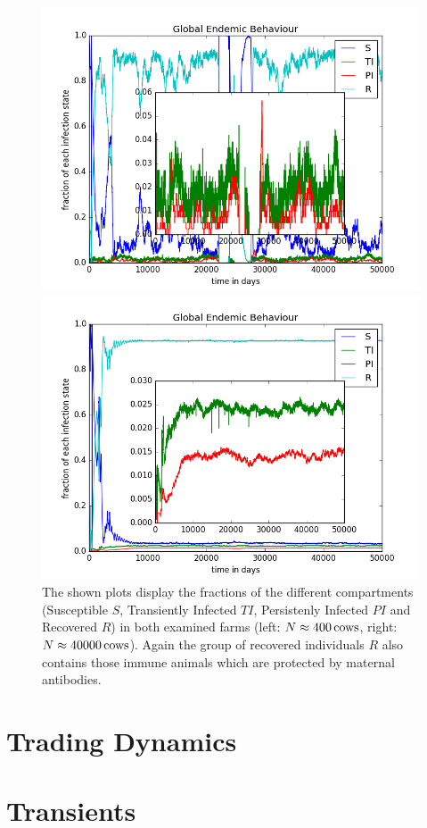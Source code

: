 \begin{figure}[htbp]
\begin{minipage}{0.5\textwidth}
\centering
\noindent\includegraphics[width=0.9\linewidth,height=\textheight,
keepaspectratio]{endemicFractions300.png} 
\end{minipage}
\begin{minipage}{0.5\textwidth}
\centering
\noindent\includegraphics[width=0.9\linewidth,height=\textheight,
keepaspectratio]{endemicFractions40000.png} 
\end{minipage}
\caption[Shares Of Compartments In Different Farm Sizes]{The shown plots display the fractions of the different compartments (Susceptible $S$, Transiently Infected $TI$, Persistenly Infected $PI$ and Recovered $R$) in both examined farms (left: $N\approx 400\,\text{cows}$, right: $N\approx 40000\,\text{cows}$). Again the group of recovered individuals $R$ also contains those immune animals which are protected by maternal antibodies.}
\label{fig:sharesCompartmentsDifferentFarmSizes}
\end{figure} 

\section{Trading Dynamics} 
\section{Transients}